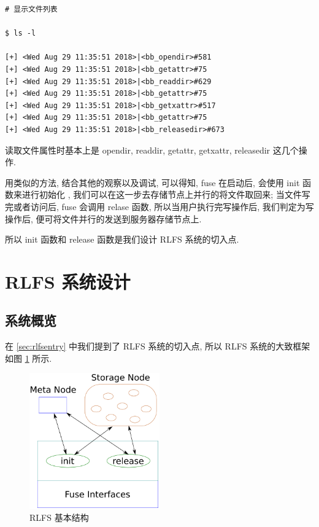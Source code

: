 \begin{lstlisting}[style=verb]
# 显示文件列表

$ ls -l

[+] <Wed Aug 29 11:35:51 2018>|<bb_opendir>#581
[+] <Wed Aug 29 11:35:51 2018>|<bb_getattr>#75
[+] <Wed Aug 29 11:35:51 2018>|<bb_readdir>#629
[+] <Wed Aug 29 11:35:51 2018>|<bb_getattr>#75
[+] <Wed Aug 29 11:35:51 2018>|<bb_getxattr>#517
[+] <Wed Aug 29 11:35:51 2018>|<bb_getattr>#75
[+] <Wed Aug 29 11:35:51 2018>|<bb_releasedir>#673
\end{lstlisting}

读取文件属性时基本上是 opendir, readdir, getattr, getxattr, releasedir 这几个操作.

用类似的方法, 结合其他的观察以及调试, 可以得知, fuse 在启动后, 会使用 init 函数来进行初始化
, 我们可以在这一步去存储节点上并行的将文件取回来; 当文件写完或者访问后, fuse 会调用 relase 函数,
所以当用户执行完写操作后, 我们判定为写操作后, 便可将文件并行的发送到服务器存储节点上.

所以 init 函数和 release 函数是我们设计 RLFS 系统的切入点.

\section{RLFS 系统设计}
\subsection{系统概览}
在 \ref{sec:rlfsentry} 中我们提到了 RLFS  系统的切入点, 所以 RLFS 系统的大致框架如图
\ref{fig:rlfs} 所示.

\begin{figure}[H]
    \centerline{\includegraphics[width=0.5\textwidth]{./Figures/rlfs.pdf}}
    \caption{RLFS 基本结构}
    \label{fig:rlfs}
\end{figure}

